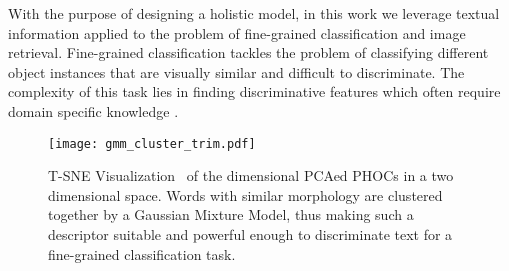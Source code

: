 \documentclass[10pt,twocolumn,letterpaper]{article}
\begin{document}
With the purpose of designing a holistic model, in this work we leverage textual information applied to the problem of fine-grained classification and image retrieval.
Fine-grained classification tackles the problem of classifying different object instances that are visually similar and difficult to discriminate.
The complexity of this task lies in finding discriminative features 
which often require domain specific knowledge \cite{maji2013fine, xiao2015application}. 




\begin{figure}[htb]

\centering
\texttt{[image: gmm\_cluster\_trim.pdf]}
\caption{T-SNE Visualization~\cite{maaten2008visualizing} of the  dimensional PCAed PHOCs in a two dimensional space. Words with similar morphology are clustered together by a Gaussian Mixture Model, thus making such a descriptor suitable and powerful enough to discriminate text for a fine-grained classification task.}

\label{fig:gmm_cluster}
\end{figure}
\end{document}

